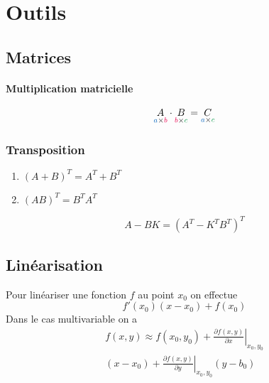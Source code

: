 \documentclass[resume]{subfiles}
\begin{document}
\section{Outils}
\subsection{Matrices}
\paragraph{Multiplication matricielle}
$$\underset{\textcolor{RoyalBlue}{a}\times \textcolor{OrangeRed}{b}}{A}\cdot \underset{\textcolor{OrangeRed}{b}\times \textcolor{ForestGreen}{c}}{B}=\underset{\textcolor{RoyalBlue}{a}\times \textcolor{ForestGreen}{c}}{C}$$
\subsubsection{Transposition}
\begin{enumerate}
\item $(A+B)^T=A^T+B^T$
\item $(AB)^T=B^TA^T$
\end{enumerate}

\begin{equation}
\boxed{A-BK=\left(A^T-K^TB^T  \right)^{T}}
\label{transpose_matrice}
\end{equation}
\subsection{Linéarisation}
Pour linéariser une fonction $f$ au point $x_0$ on effectue
$$f'(x_0)(x-x_0)+f(x_0)$$
Dans le cas multivariable on a
\begin{multline*}
f(x,y) \approx f(x_0,y_0) + \left. {\frac{{\partial f(x,y)}}{{\partial x}}} \right|_{x_0,y_0} \\
(x - x_0) + \left. {\frac{{\partial f(x,y)}}{{\partial y}}} \right|_{x_0,y_0} (y - b_0)
\end{multline*}
\end{document}
